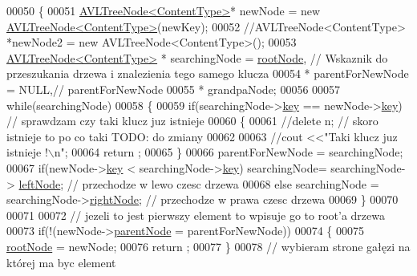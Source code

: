 \begin{DoxyCode}
00050         \{
00051         \hyperlink{class_a_v_l_tree_node}{AVLTreeNode<ContentType>}* newNode = \textcolor{keyword}{new} 
      \hyperlink{class_a_v_l_tree_node}{AVLTreeNode<ContentType>}(newKey);
00052                 \textcolor{comment}{//AVLTreeNode<ContentType>  *newNode2 = new AVLTreeNode<ContentType>();}
00053           \hyperlink{class_a_v_l_tree_node}{AVLTreeNode<ContentType>} * searchingNode = 
      \hyperlink{class_a_v_l_tree_aee3daa1b05e59d770a95e1274f09eb22}{rootNode},       \textcolor{comment}{// Wskaznik do przeszukania drzewa i znalezienia tego samego klucza}
00054                           * parentForNewNode = NULL,\textcolor{comment}{// parentForNewNode}
00055                           * grandpaNode;
00056 
00057           \textcolor{keywordflow}{while}(searchingNode)
00058           \{
00059             \textcolor{keywordflow}{if}(searchingNode->\hyperlink{class_a_v_l_tree_node_a717c2f6c33504a065570802e95189a57}{key} == newNode->\hyperlink{class_a_v_l_tree_node_a717c2f6c33504a065570802e95189a57}{key}) \textcolor{comment}{// sprawdzam czy taki klucz juz istnieje}
00060             \{
00061               \textcolor{comment}{//delete n; // skoro istnieje to po co taki TODO: do zmiany}
00062 
00063               \textcolor{comment}{//cout    <<"Taki klucz juz istnieje !\(\backslash\)n";}
00064               return ;
00065             \}
00066             parentForNewNode = searchingNode;
00067             \textcolor{keywordflow}{if}(newNode->\hyperlink{class_a_v_l_tree_node_a717c2f6c33504a065570802e95189a57}{key} < searchingNode->\hyperlink{class_a_v_l_tree_node_a717c2f6c33504a065570802e95189a57}{key}) searchingNode= searchingNode->
      \hyperlink{class_a_v_l_tree_node_afc53d4774f375c23795c9eb598f4d7cd}{leftNode}; \textcolor{comment}{// przechodze w lewo czesc drzewa}
00068             \textcolor{keywordflow}{else} searchingNode = searchingNode->\hyperlink{class_a_v_l_tree_node_a51dfb148f27625c89a3a153760517c38}{rightNode};                             \textcolor{comment}{//
       przechodze w prawa czesc drzewa}
00069           \}
00070 
00071 
00072           \textcolor{comment}{// jezeli to jest pierwszy element to wpisuje go to root'a drzewa}
00073           \textcolor{keywordflow}{if}(!(newNode->\hyperlink{class_a_v_l_tree_node_ae64d1261fea217d3e85928e7cf2a9151}{parentNode} = parentForNewNode))
00074           \{
00075             \hyperlink{class_a_v_l_tree_aee3daa1b05e59d770a95e1274f09eb22}{rootNode} = newNode;
00076             return ;
00077           \}
00078           \textcolor{comment}{// wybieram strone gałęzi na której ma byc element}

\end{DoxyCode}
